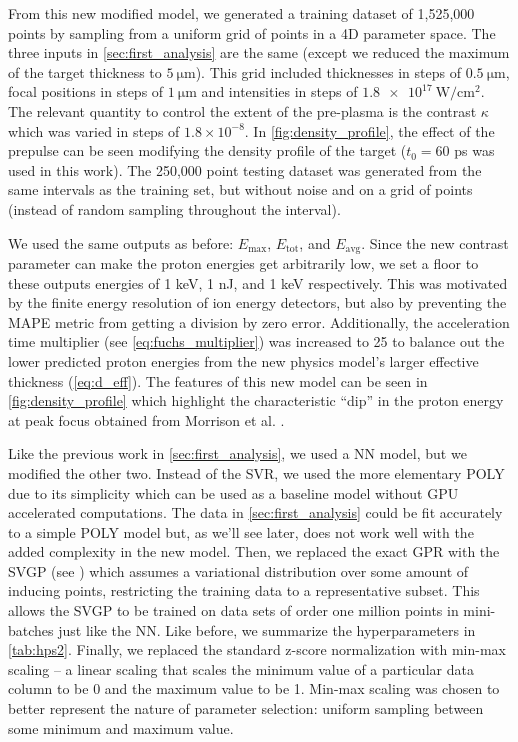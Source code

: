 From this new modified model, we generated a training dataset of 1,525,000 points by sampling from a uniform grid of points in a 4D parameter space. The three inputs in \autoref{sec:first_analysis} are the same (except we reduced the maximum of the target thickness to $\SI{5}{\micro \meter}$). This grid included thicknesses in steps of $\SI{0.5}{\micro \meter}$, focal positions in steps of $\SI{1}{\micro \meter}$ and intensities in steps of $\SI{1.8e17}{\watt \per \centi \meter \squared}$. The relevant quantity to control the extent of the pre-plasma is the contrast $\kappa$ which was varied in steps of $1.8 \times 10^{-8}$. In \autoref{fig:density_profile}, the effect of the prepulse can be seen modifying the density profile of the target ($t_0 = 60$ ps was used in this work). The 250,000 point testing dataset was generated from the same intervals as the training set, but without noise and on a grid of points (instead of random sampling throughout the interval).

We used the same outputs as before: $E_\text{max}$, $E_\text{tot}$, and $E_\text{avg}$. Since the new contrast parameter can make the proton energies get arbitrarily low, we set a floor to these outputs energies of 1 keV, 1 nJ, and 1 keV respectively. This was motivated by the finite energy resolution of ion energy detectors, but also by preventing the \gls{MAPE} metric from getting a division by zero error. Additionally, the acceleration time multiplier (see \autoref{eq:fuchs_multiplier}) was increased to 25 to balance out the lower predicted proton energies from the new physics model's larger effective thickness (\autoref{eq:d_eff}). The features of this new model can be seen in \autoref{fig:density_profile} which highlight the characteristic ``dip'' in the proton energy at peak focus obtained from Morrison et al. \cite{Morrison_2018_NJoP}.

Like the previous work in \autoref{sec:first_analysis}, we used a \gls{NN} model, but we modified the other two. Instead of the \gls{SVR}, we used the more elementary \gls{POLY} due to its simplicity which can be used as a baseline model without \gls{GPU} accelerated computations. The data in \autoref{sec:first_analysis} could be fit accurately to a simple \gls{POLY} model but, as we'll see later, does not work well with the added complexity in the new model. Then, we replaced the exact \gls{GPR} with the \gls{SVGP} (see \cite{Hensman_2014_SVGP}) which assumes a variational distribution over some amount of inducing points, restricting the training data to a representative subset. This allows the \gls{SVGP} to be trained on data sets of order one million points in mini-batches just like the \gls{NN}. Like before, we summarize the hyperparameters in \autoref{tab:hps2}.  Finally, we replaced the standard z-score normalization with min-max scaling -- a linear scaling that scales the minimum value of a particular data column to be 0 and the maximum value to be 1. Min-max scaling was chosen to better represent the nature of parameter selection: uniform sampling between some minimum and maximum value.

